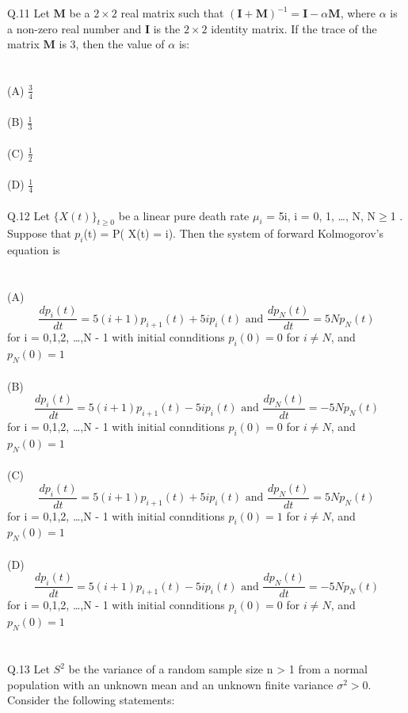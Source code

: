 \documentclass{book}[200pt]
\begin{document}
{	    Q.11 Let $\mathbf{M}$ be a $2 \times 2$ real matrix such that 
	   $(\mathbf{I} + \mathbf{M})^{-1} = \mathbf{I} - \alpha \mathbf{M}$, 
	   where $\alpha$ is a non-zero real number and $\mathbf{I}$ is the $2 \times 2$ identity matrix. 
	   If the trace of the matrix $\mathbf{M}$ is $3$, then the value of $\alpha$ is:\\
	   \\
	   \\
	   (A) $\frac{3}{4}$\\
	   \\
	   (B) $\frac{1}{3}$\\
	   \\
	   (C) $\frac{1}{2}$\\
	   \\
	   (D) $\frac{1}{4}$\\ 
	   \\
	   Q.12 Let $ \{X(t)\}_{t\geq0} $ be a linear pure death rate $\mu_i $ = 5i, i = 0, 1, \dots , N, N$\geq$1 . Suppose that $p_i$(t) = P( X(t) = i). Then the system of forward Kolmogorov's equation is\\
	   \\
	   \\
	   (A) $$ \frac{dp_i(t)}{dt} = 5(i + 1)p_{i+1}(t) + 5i  p_i(t)     \text{     and         }   \frac{dp_N(t)}{dt} = 5Np_N(t)$$ for i = 0,1,2, \dots ,N - 1 with initial connditions $p_i(0) = 0$ for $i \neq N $, and $p_N(0) = 1$\\
	   \\
	   (B) $$ \frac{dp_i(t)}{dt} = 5(i + 1)p_{i+1}(t) - 5i  p_i(t)     \text{     and         }   \frac{dp_N(t)}{dt} = -5Np_N(t)$$ for i = 0,1,2, \dots ,N - 1 with initial connditions $p_i(0) = 0$ for $i \neq N $, and $p_N(0) = 1$ \\
	   \\
	   (C) $$ \frac{dp_i(t)}{dt} = 5(i + 1)p_{i+1}(t) + 5i  p_i(t)     \text{     and         }   \frac{dp_N(t)}{dt} = 5Np_N(t)$$ for i = 0,1,2, \dots ,N - 1 with initial connditions $p_i(0) = 1$ for $i \neq N $, and $p_N(0) = 1$ \\
	   \\
	   (D)$$ \frac{dp_i(t)}{dt} = 5(i + 1)p_{i+1}(t) -  5i  p_i(t)     \text{     and         }   \frac{dp_N(t)}{dt} = -5Np_N(t)$$ for i = 0,1,2, \dots ,N - 1 with initial connditions $p_i(0) = 0$ for $i \neq N $, and $p_N(0) = 1$ \\
	   \\
	   \\
	   Q.13 Let $ S^2  $ be the variance of a random sample size n > 1 from a normal population with an unknown mean and an unknown finite variance $ \sigma^2 > 0$.  Consider the following statements:\\
}
\end{document}
